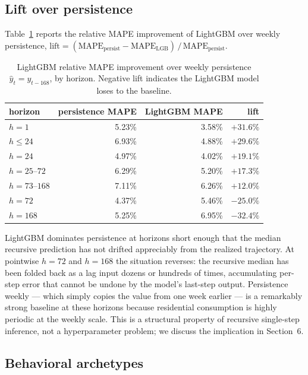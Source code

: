 \documentclass[11pt]{article}
\begin{document}
\subsection{Lift over persistence}

Table~\ref{tab:lift} reports the relative MAPE improvement of LightGBM
over weekly persistence,
$\text{lift} = (\text{MAPE}_{\text{persist}} - \text{MAPE}_{\text{LGB}})\,/\,\text{MAPE}_{\text{persist}}$.

\begin{table}[t]
\centering
\caption{LightGBM relative MAPE improvement over weekly persistence
$\hat{y}_t = y_{t-168}$, by horizon. Negative lift indicates the
LightGBM model loses to the baseline.}
\label{tab:lift}
\small
\begin{tabular}{l r r r}
\toprule
horizon & persistence MAPE & LightGBM MAPE & lift \\
\midrule
$h = 1$        & 5.23\% & 3.58\% & $+31.6\%$ \\
$h \leq 24$    & 6.93\% & 4.88\% & $+29.6\%$ \\
$h = 24$       & 4.97\% & 4.02\% & $+19.1\%$ \\
$h = 25\text{--}72$  & 6.29\% & 5.20\% & $+17.3\%$ \\
$h = 73\text{--}168$ & 7.11\% & 6.26\% & $+12.0\%$ \\
\midrule
$h = 72$       & 4.37\% & 5.46\% & $-25.0\%$ \\
$h = 168$      & 5.25\% & 6.95\% & $-32.4\%$ \\
\bottomrule
\end{tabular}
\end{table}

LightGBM dominates persistence at horizons short enough that the median
recursive prediction has not drifted appreciably from the realized
trajectory. At pointwise $h = 72$ and $h = 168$ the situation reverses:
the recursive median has been folded back as a lag input dozens or
hundreds of times, accumulating per-step error that cannot be undone by
the model's last-step output. Persistence weekly --- which simply copies
the value from one week earlier --- is a remarkably strong baseline at
these horizons because residential consumption is highly periodic at the
weekly scale. This is a structural property of recursive single-step
inference, not a hyperparameter problem; we discuss the implication in
Section~6.

\subsection{Behavioral archetypes}
\end{document}
